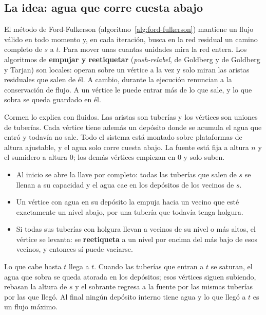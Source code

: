 \documentclass[11pt,letterpaper]{article}
\begin{document}

\subsection*{La idea: agua que corre cuesta abajo}

El método de Ford-Fulkerson (algoritmo~\ref{alg:ford-fulkerson})
mantiene un flujo válido en todo momento y, en cada iteración, busca en
la red residual un camino completo de $s$ a $t$. Para mover unas
cuantas unidades mira la red entera. Los algoritmos de
\textbf{empujar y reetiquetar} (\textit{push-relabel}, de Goldberg y de
Goldberg y Tarjan) son locales: operan sobre un vértice a la vez y solo
miran las aristas residuales que salen de él. A cambio, durante la
ejecución renuncian a la conservación de flujo. A un vértice le puede
entrar más de lo que sale, y lo que sobra se queda guardado en él.

Cormen lo explica con fluidos. Las aristas son tuberías y los vértices
son uniones de tuberías. Cada vértice tiene además un depósito donde
se acumula el agua que entró y todavía no sale. Todo el sistema está
montado sobre plataformas de altura ajustable, y el agua solo corre
cuesta abajo. La fuente está fija a altura $n$ y el sumidero a altura
$0$; los demás vértices empiezan en $0$ y solo suben.

\begin{itemize}
  \item Al inicio se abre la llave por completo: todas las tuberías que
        salen de $s$ se llenan a su capacidad y el agua cae en los
        depósitos de los vecinos de $s$.
  \item Un vértice con agua en su depósito la empuja hacia un vecino
        que esté exactamente un nivel abajo, por una tubería que
        todavía tenga holgura.
  \item Si todas sus tuberías con holgura llevan a vecinos de su nivel
        o más altos, el vértice se levanta: se \textbf{reetiqueta} a un
        nivel por encima del más bajo de esos vecinos, y entonces sí
        puede vaciarse.
\end{itemize}

Lo que cabe hasta $t$ llega a $t$. Cuando las tuberías que entran a
$t$ se saturan, el agua que sobra se queda atorada en los depósitos;
esos vértices siguen subiendo, rebasan la altura de $s$ y el sobrante
regresa a la fuente por las mismas tuberías por las que llegó. Al
final ningún depósito interno tiene agua y lo que llegó a $t$ es un
flujo máximo.
\end{document}

